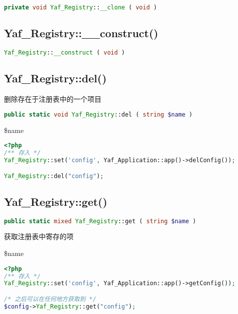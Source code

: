 \begin{lstlisting}[language=PHP]
private void Yaf_Registry::__clone ( void )
\end{lstlisting}


\subsection{Yaf\_Registry::\_\_construct()}


\begin{lstlisting}[language=PHP]
Yaf_Registry::__construct ( void )
\end{lstlisting}

\subsection{Yaf\_Registry::del()}


删除存在于注册表中的一个项目


\begin{lstlisting}[language=PHP]
public static void Yaf_Registry::del ( string $name )
\end{lstlisting}

\begin{compactitem}
\item \$name
\end{compactitem}

\begin{lstlisting}[language=PHP]
<?php
/** 存入 */
Yaf_Registry::set('config', Yaf_Application::app()->delConfig());

Yaf_Registry::del("config");
\end{lstlisting}

\subsection{Yaf\_Registry::get()}


\begin{lstlisting}[language=PHP]
public static mixed Yaf_Registry::get ( string $name )
\end{lstlisting}

获取注册表中寄存的项

\begin{compactitem}
\item \$name
\end{compactitem}



\begin{lstlisting}[language=PHP]
<?php
/** 存入 */
Yaf_Registry::set('config', Yaf_Application::app()->getConfig());

/* 之后可以在任何地方获取到 */
$config->Yaf_Registry::get("config");
\end{lstlisting}

